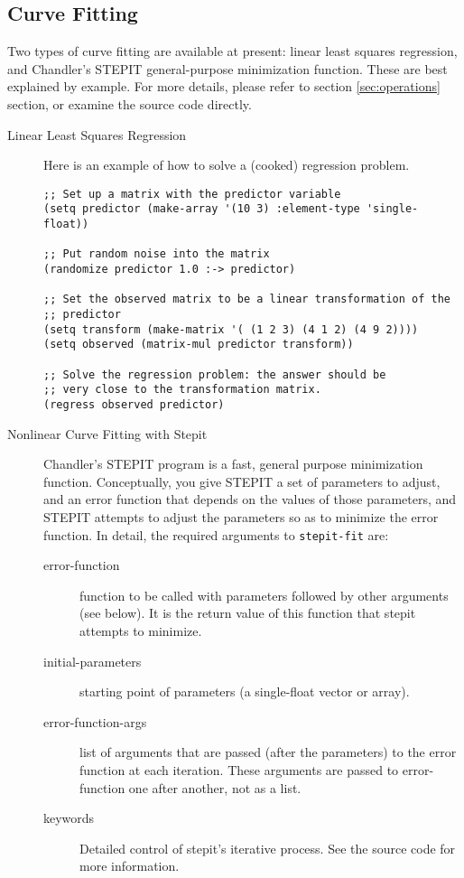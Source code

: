 \subsection{Curve Fitting}

Two types of curve fitting are available at present: linear least
squares regression, and Chandler's STEPIT general-purpose minimization
function.  These are best explained by example.  For more details,
please refer to section \ref{sec:operations} section, or examine the
source code directly.
\begin{description}

\item[Linear Least Squares Regression] Here is an example of how to
solve a (cooked) regression problem.
\begin{verbatim}
;; Set up a matrix with the predictor variable
(setq predictor (make-array '(10 3) :element-type 'single-float))

;; Put random noise into the matrix
(randomize predictor 1.0 :-> predictor)

;; Set the observed matrix to be a linear transformation of the
;; predictor
(setq transform (make-matrix '( (1 2 3) (4 1 2) (4 9 2))))
(setq observed (matrix-mul predictor transform))

;; Solve the regression problem: the answer should be
;; very close to the transformation matrix.
(regress observed predictor)
\end{verbatim}

\item[Nonlinear Curve Fitting with Stepit]
Chandler's STEPIT program is a fast, general purpose minimization
function. Conceptually, you give STEPIT a set of parameters to adjust,
and an error function that depends on the values of those parameters,
and STEPIT attempts to adjust the parameters so as to minimize the
error function. In detail, the required arguments to {\tt stepit-fit}
are:
\begin{description}
\item[error-function] function to be called with parameters
followed by other arguments (see below).
It is the return value of this function that stepit attempts to minimize. 
\item[initial-parameters]
starting point of parameters (a single-float vector or array).
\item[error-function-args]
list of arguments that are passed (after the parameters)
to the error function at each iteration. 
These arguments are passed to error-function one after another, not as a list.
\item[keywords] Detailed control of stepit's iterative process.
See the source code for more information.
\end{description}


\end{description}
